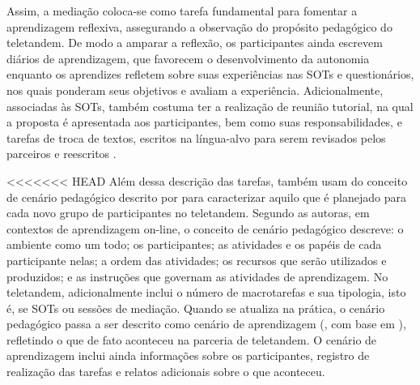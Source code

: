 \documentclass[portuguese]{textolivre}
\begin{document}
Assim, a mediação coloca-se como tarefa fundamental para fomentar a aprendizagem reflexiva, assegurando a observação do propósito pedagógico do teletandem. De modo a amparar a reflexão, os participantes ainda escrevem diários de aprendizagem, que favorecem o desenvolvimento da autonomia enquanto os aprendizes refletem sobre suas experiências nas SOTs e questionários, nos quais ponderam seus objetivos e avaliam a experiência. Adicionalmente, associadas às SOTs, também costuma ter a realização de reunião tutorial, na qual a proposta é apresentada aos participantes, bem como suas responsabilidades, e tarefas de troca de textos, escritos na língua-alvo para serem revisados pelos parceiros e reescritos \cite{aranha2014}.

<<<<<<< HEAD
Além dessa descrição das tarefas, \textcite{aranha2017} também usam do conceito de cenário pedagógico descrito por \textcite{chanier2016} para caracterizar aquilo que é planejado para cada novo grupo de participantes no teletandem. Segundo as autoras, em contextos de aprendizagem on-line, o conceito de cenário pedagógico descreve: o ambiente como um todo; os participantes; as atividades e os papéis de cada participante nelas; a ordem das atividades; os recursos que serão utilizados e produzidos; e as instruções que governam as atividades de aprendizagem. No teletandem, adicionalmente inclui o número de macrotarefas e sua tipologia, isto é, se SOTs ou sessões de mediação. Quando se atualiza na prática, o cenário pedagógico passa a ser descrito como cenário de aprendizagem (\textcite{aranha2017}, com base em \textcite{foucher2010}), refletindo o que de fato aconteceu na parceria de teletandem. O cenário de aprendizagem inclui ainda informações sobre os participantes, registro de realização das tarefas e relatos adicionais sobre o que aconteceu.
\end{document}
